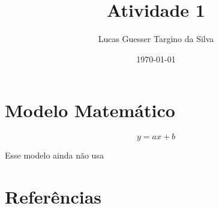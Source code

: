 \documentclass{article}
\title{Atividade 1}
\author{Lucas Guesser Targino da Silva}
\date{\today}
\begin{document}
\maketitle

\section{Modelo Matemático}

\begin{equation}
  y = a x + b
\end{equation}

Esse modelo ainda não usa \cite{bib:gurobi}

\section{Referências}



\end{document}
